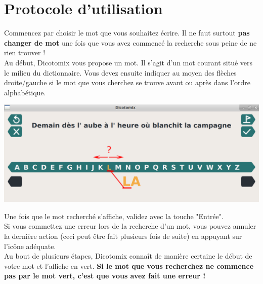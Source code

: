 \documentclass[french]{article}
\begin{document}
\section*{Protocole d'utilisation}
Commencez par choisir le mot que vous souhaitez écrire. Il ne faut surtout \textbf{pas changer de mot} une fois que vous avez commencé la recherche sous peine de ne rien trouver !
\\
Au début, Dicotomix vous propose un mot. Il s'agit d'un mot courant situé vers le milieu du dictionnaire. Vous devez ensuite indiquer au moyen des flèches droite/gauche si le mot que vous cherchez se trouve avant ou après dans l'ordre alphabétique.
\\
\begin{center}
	\includegraphics[scale=0.22]{ex1}
\end{center}
Une fois que le mot recherché s'affiche, validez avec la touche "Entrée".
\\
Si vous commettez une erreur lors de la recherche d'un mot, vous pouvez annuler la dernière action (ceci peut être fait plusieurs fois de suite) en appuyant sur l'icône adéquate.
\\
Au bout de plusieurs étapes, Dicotomix connaît de manière certaine le début de votre mot et l'affiche en vert. \textbf{Si le mot que vous recherchez ne commence pas par le mot vert, c'est que vous avez fait une erreur !}
\\
\end{document}
